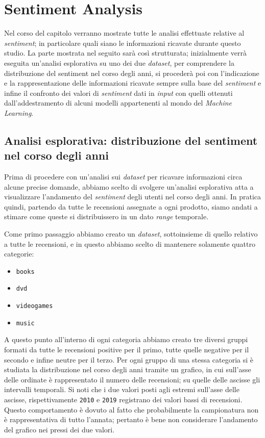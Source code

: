 \chapter{Sentiment Analysis}   
\label{cap:SentimentAnalysis}
	Nel corso del capitolo verranno mostrate tutte le analisi effettuate relative al \textit{sentiment}; in particolare quali siano le informazioni ricavate durante questo studio. La parte mostrata nel seguito sarà così strutturata; inizialmente verrà eseguita un'analisi esplorativa su uno dei due \textit{dataset}, per comprendere la distribuzione del sentiment nel corso degli anni, si procederà poi con l'indicazione e la rappresentazione delle informazioni ricavate sempre sulla base del \textit{sentiment} e infine il confronto dei valori di \textit{sentiment} dati in \textit{input} con quelli ottenuti dall'addestramento di alcuni modelli appartenenti al mondo del \textit{Machine Learning}.
	
	\section{Analisi esplorativa: distribuzione del sentiment nel corso degli anni}
		Prima di procedere con un'analisi sui \textit{dataset} per ricavare informazioni circa alcune precise domande, abbiamo scelto di svolgere un'analisi esplorativa atta a visualizzare l'andamento del \textit{sentiment} degli utenti nel corso degli anni. In pratica quindi, partendo da tutte le recensioni assegnate a ogni prodotto, siamo andati a stimare come queste si distribuissero in un dato \textit{range} temporale. 
		
		Come primo passaggio abbiamo creato un \textit{dataset}, sottoinsieme di quello relativo a tutte le recensioni, e in questo abbiamo scelto di mantenere solamente quattro categorie:
		\begin{itemize}
			\item \texttt{books}
			\item \texttt{dvd}
			\item \texttt{videogames}
			\item \texttt{music}
		\end{itemize}
		
		A questo punto all'interno di ogni categoria abbiamo creato tre diversi gruppi formati da tutte le recensioni positive per il primo, tutte quelle negative per il secondo e infine neutre per il terzo. Per ogni gruppo di una stessa categoria si è studiata la distribuzione nel corso degli anni tramite un grafico, in cui sull'asse delle ordinate è rappresentato il numero delle recensioni; su quelle delle ascisse gli intervalli temporali. Si noti che i due valori posti agli estremi sull'asse delle ascisse, rispettivamente \verb|2010| e \verb|2019| registrano dei valori bassi di recensioni. Questo comportamento è dovuto al fatto che probabilmente la campionatura non è rappresentativa di tutto l'annata; pertanto è bene non considerare l'andamento del grafico nei pressi dei due valori.
		
